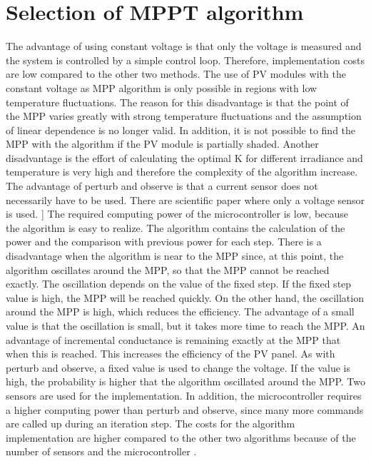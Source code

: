 \section{Selection of MPPT algorithm}\label{MPPTselection}

The advantage of using constant voltage is that only the voltage is measured and the system is controlled by a simple control loop. Therefore, implementation costs are low compared to the other two methods. The use of PV modules with the constant voltage as MPP algorithm is only possible in regions with low temperature fluctuations. The reason for this disadvantage is that the point of the MPP varies greatly with strong temperature fluctuations and the assumption of linear dependence is no longer valid. In addition, it is not possible to find the MPP with the algorithm if the PV module is partially shaded. Another disadvantage is the effort of calculating the optimal K for different irradiance and temperature is very high and therefore the complexity of the algorithm increase. \newline 
The advantage of perturb and observe is that a current sensor does not necessarily have to be used. There are scientific paper where only a voltage sensor is used. ] \cite{}  The required computing power of the microcontroller is low, because the algorithm is easy to realize. The algorithm contains the calculation of the power and the comparison with previous power for each step. There is a disadvantage when the algorithm is near to the MPP since, at this point, the algorithm oscillates around the MPP, so that the MPP cannot be reached exactly. The oscillation depends on the value of the fixed step. If the fixed step value is high, the MPP will be reached quickly. On the other hand, the oscillation around the MPP is high, which reduces the efficiency. The advantage of a small value is that the oscillation is small, but it takes more time to reach the MPP. \newline
An advantage of incremental conductance is remaining exactly at the MPP that when this is reached. This increases the efficiency of the PV panel. As with perturb and observe, a fixed value is used to change the voltage. If the value is high, the probability is higher that the algorithm oscillated around the MPP. 
Two sensors are used for the implementation. In addition, the microcontroller requires a higher computing power than perturb and observe, since many more commands are called up during an iteration step. The costs for the algorithm implementation are higher compared to the other two algorithms because of the number of sensors and the microcontroller . \newline
